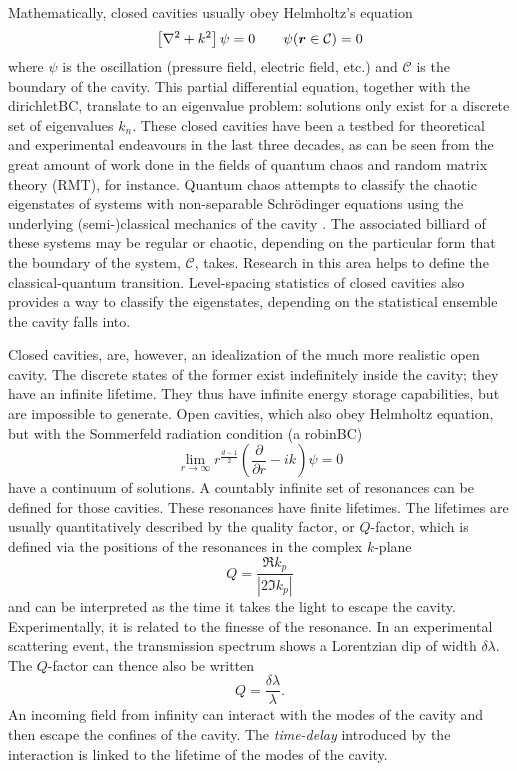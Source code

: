 Mathematically, closed cavities usually obey Helmholtz's equation
  \begin{equation}
   \left[\nabla^2+k^2\right]\psi=0\qquad \psi(\boldsymbol{r}\in\mathcal{C})=0
  \end{equation}
where $\psi$ is the oscillation (pressure field, electric field, etc.)
and $\mathcal{C}$ is the boundary of the cavity. This partial differential
equation, together with the \gls{dirichletBC}, translate to an
eigenvalue problem: solutions only exist for a discrete set of eigenvalues 
$k_n$. These closed cavities have been a testbed for theoretical
and experimental endeavours in the last three decades, as can be
seen from the great amount of work done in the fields of quantum 
chaos and random matrix theory (RMT), for instance. Quantum chaos attempts
to classify the chaotic eigenstates of systems with non-separable Schrödinger
equations using the underlying (semi-)classical mechanics of the 
cavity \cite{BLU1990,BAT2013}. The associated billiard of these systems
may be regular or chaotic, depending on the particular form that the boundary
of the system, $\mathcal{C}$, takes. Research in this area helps to define the classical-quantum
transition. Level-spacing statistics of closed cavities also provides
a way to classify the eigenstates, depending on the statistical 
ensemble the cavity falls into. 

Closed cavities, are, however, an idealization of the much more
realistic open cavity. The discrete states of the former exist 
indefinitely inside the cavity; they have an infinite lifetime. 
They thus have infinite energy storage capabilities, but are impossible 
to generate. Open cavities, which also obey Helmholtz equation, but with the 
Sommerfeld radiation condition (a \gls{robinBC})
  \begin{equation}
   \lim_{r\rightarrow\infty}r^{\frac{d-1}{2}}\left(\frac{\partial}{\partial r}-ik\right)\psi=0
  \end{equation}
have a continuum of solutions. A countably infinite set of resonances
can be defined for those cavities. These resonances have finite lifetimes.
The lifetimes are usually quantitatively described by the quality
factor, or $Q$-factor, which is defined via the positions of the resonances
in the complex $k$-plane 
	\begin{equation}
		Q = \frac{\Re{k_p}}{\left|2\Im{k_p}\right|}
	\end{equation}
and can be interpreted as the time it takes the light to escape the 
cavity. Experimentally, it is related to the finesse of the resonance. 
In an experimental scattering event, the transmission spectrum shows
a Lorentzian dip of width $\delta\lambda$. The $Q$-factor can thence
also be written
	\begin{equation}
		\label{eq:intro.expQfactor}
		Q = \frac{\delta\lambda}{\lambda}.
	\end{equation}
An incoming field from infinity can interact with the modes of the
cavity and then escape the confines of the cavity. The \textit{time-delay} introduced
by the interaction is linked to the lifetime of the modes of the cavity. 

